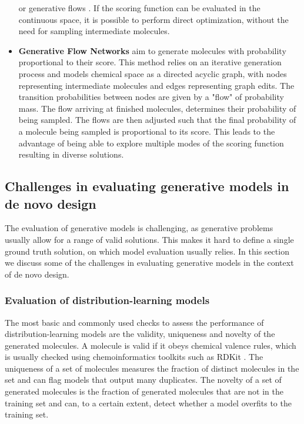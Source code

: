 \begin{itemize}
          \citep{gomez-bombarelliAutomaticChemicalDesign2018,kusnerGrammarVariationalAutoencoder2017,winterEfficientMultiobjectiveMolecular2019}
          or generative flows \citep{madhawaGraphNVPInvertibleFlow2019}. If the scoring
          function can be evaluated in the continuous space, it is possible to perform direct
          optimization, without the need for sampling intermediate molecules.
    \item \textbf{Generative Flow Networks} \citep{bengioFlowNetworkBased2021} aim to generate
          molecules with probability proportional to their score. This method relies on an
          iterative generation process and models chemical space as a directed acyclic graph, with
          nodes representing intermediate molecules and edges representing graph edits. The transition
          probabilities between nodes are given by a "flow" of probability mass. The flow arriving
          at finished molecules, determines their probability of being sampled. The flows are
          then adjusted such that the final probability of a molecule being sampled is
          proportional to its score. This leads to the advantage of being able to explore multiple
          modes of the scoring function resulting in diverse solutions.
\end{itemize}

\subsection{Challenges in evaluating generative models in de novo design}

The evaluation of generative models is challenging, as generative problems usually allow for a
range of valid solutions. This makes it hard to define a single ground truth solution, on which model
evaluation usually relies. In this section we discuss some of the challenges in evaluating
generative models in the context of de novo design.

\subsubsection{Evaluation of distribution-learning models}
The most basic and commonly used checks to assess the performance of distribution-learning models
are the validity, uniqueness and novelty of the generated molecules. A molecule is valid if it obeys
chemical valence rules, which is usually checked using chemoinformatics toolkits such as RDKit
\citep{landrumRDKitOpensourceCheminformatics2006}. The uniqueness of a set of molecules measures the
fraction of distinct molecules in the set and can flag models that output many duplicates. The novelty
of a set of generated molecules is the fraction of generated molecules that are not in the training
set and can, to a certain extent, detect whether a model overfits to the training set.

